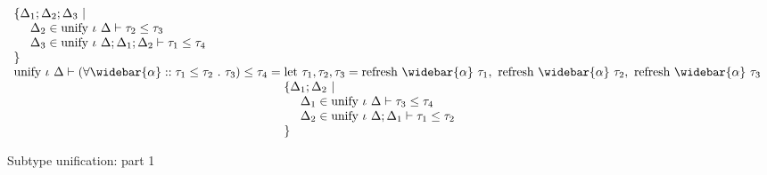 \documentclass[sigplan,screen]{acmart}
\begin{document}
\begin{figure*}[h]
\[\begin{array}{l @{} l}
\begin{array}[t]{@{} l}
        \{\Delta_1;\Delta_2;\Delta_3\ |
        \\ 
        \ \ \ \ \Delta_2 \in \text{unify } \iota\ \Delta \vdash \tau_2 \leq \tau_3
        \\
        \ \ \ \ \Delta_3 \in \text{unify } \iota\ \Delta;\Delta_1;\Delta_2 \vdash \tau_1 \leq \tau_4
        \\ 
        \}
      \end{array}
      \\
      \text{unify } \iota\ \Delta \vdash
      (\forall \widebar{\alpha} :: \tau_1 \leq \tau_2\ .\ \tau_3)
      \leq 
      \tau_4
      &{} = 
      \begin{array}[t]{@{} l}
        \text{let } \tau_1, \tau_2, \tau_3 = 
        \text{refresh } \widebar{\alpha}\ \tau_1,\ 
        \text{refresh } \widebar{\alpha}\ \tau_2,\ 
        \text{refresh } \widebar{\alpha}\ \tau_3
        \\
        \{\Delta_1;\Delta_2\ |
        \\ 
        \ \ \ \ \Delta_1 \in \text{unify } \iota\ \Delta \vdash \tau_3 \leq \tau_4
        \\
        \ \ \ \ \Delta_2 \in \text{unify } \iota\ \Delta;\Delta_1 \vdash \tau_1 \leq \tau_2
        \\
        \}
      \end{array}

    \end{array}
  \]
  \caption{Subtype unification: part 1}
\end{figure*}
\end{document}

